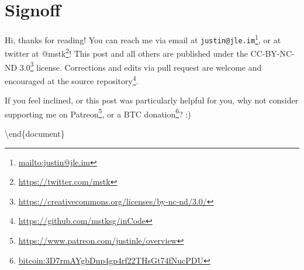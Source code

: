 \documentclass[]{article}
\renewcommand{\href}[2]{#2\footnote{\url{#1}}}
\begin{document}
\section{Signoff}\label{signoff}

Hi, thanks for reading! You can reach me via email at
\href{mailto:justin@jle.im}{\nolinkurl{justin@jle.im}}, or at twitter at
\href{https://twitter.com/mstk}{@mstk}! This post and all others are published
under the \href{https://creativecommons.org/licenses/by-nc-nd/3.0/}{CC-BY-NC-ND
3.0} license. Corrections and edits via pull request are welcome and encouraged
at \href{https://github.com/mstksg/inCode}{the source repository}.

If you feel inclined, or this post was particularly helpful for you, why not
consider \href{https://www.patreon.com/justinle/overview}{supporting me on
Patreon}, or a \href{bitcoin:3D7rmAYgbDnp4gp4rf22THsGt74fNucPDU}{BTC donation}?
:)

\textbackslash end\{document\}
\end{document}
